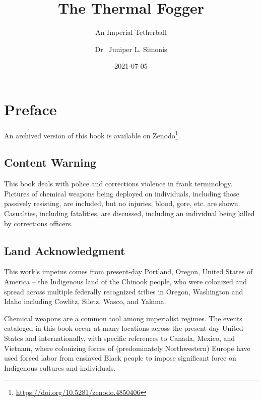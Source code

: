 \documentclass[
  11pt,
  titlepage]{krantz}
\title{The Thermal Fogger}
\subtitle{An Imperial Tetherball}
\author{Dr.~Juniper L. Simonis}
\date{2021-07-05}
\renewcommand{\href}[2]{#2\footnote{\url{#1}}}
\begin{document}
\maketitle



\setlength{\abovedisplayskip}{-5pt}
\setlength{\abovedisplayshortskip}{-5pt}

{
\hypersetup{linkcolor=}
\setcounter{tocdepth}{2}
\tableofcontents
}
\listoffigures
\hypertarget{preface}{%
\chapter*{Preface}\label{preface}}


\href{https://doi.org/10.5281/zenodo.4850406}{An archived version of this book is available on Zenodo}.

\hypertarget{content-warning}{%
\section*{Content Warning}\label{content-warning}}


This book deals with police and corrections violence in frank terminology.
Pictures of chemical weapons being deployed on individuals, including those passively resisting, are included, but no injuries, blood, gore, etc. are shown.
Casualties, including fatalities, are discussed, including an individual being killed by corrections officers.

\hypertarget{land-acknowledgment}{%
\section*{Land Acknowledgment}\label{land-acknowledgment}}


This work's impetus comes from present-day Portland, Oregon, United States of America -- the Indigenous land of the Chinook people, who were colonized and spread across multiple federally recognized tribes in Oregon, Washington and Idaho including Cowlitz, Siletz, Wasco, and Yakima.

Chemical weapons are a common tool among imperialist regimes.
The events cataloged in this book occur at many locations across the present-day United States and internationally, with specific references to Canada, Mexico, and Vietnam, where colonizing forces of (predominately Northwestern) Europe have used forced labor from enslaved Black people to impose significant force on Indigenous cultures and individuals.
\end{document}
